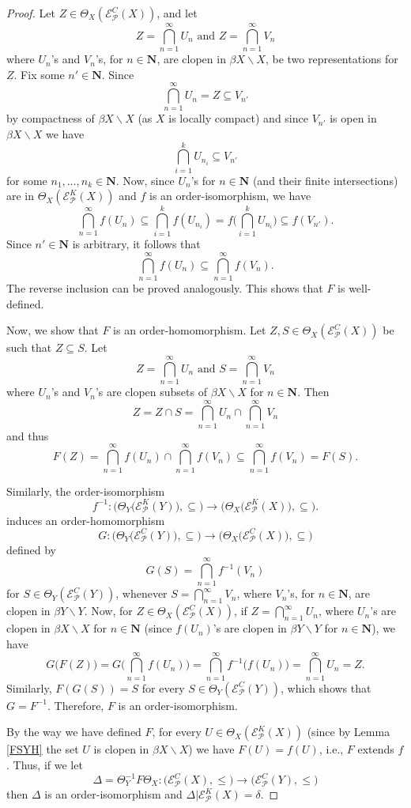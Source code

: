 \documentclass{amsart}
\theoremstyle{definition}
\theoremstyle{remark}
\theoremstyle{notation}
\numberwithin{equation}{section}
\begin{document}
\begin{proof}
Let $Z\in \Theta_X({\mathscr E}^C_{{\mathcal P}}(X))$, and let
\[Z=\bigcap_{n=1}^\infty U_n\mbox{ and }Z=\bigcap_{n=1}^\infty V_n\]
where $U_n$'s and $V_n$'s, for $n\in \mathbf{N}$, are clopen in $\beta X\backslash X$, be two representations for $Z$.  Fix some  $n'\in \mathbf{N}$. Since
\[\bigcap_{n=1}^\infty U_n=Z\subseteq V_{n'}\]
by compactness of $\beta X\backslash X$ (as $X$ is locally compact) and since $V_{n'}$ is open in $\beta X\backslash X$ we have
\[\bigcap_{i=1}^kU_{n_i}\subseteq V_{n'}\]
for some $n_1,\ldots,n_k\in \mathbf{N}$. Now, since $U_n$'s for $n\in \mathbf{N}$ (and their finite intersections) are
in  $\Theta_X({\mathscr E}^K_{{\mathcal P}}(X))$ and $f$ is an  order-isomorphism, we have
\[\bigcap_{n=1}^\infty f(U_n)\subseteq\bigcap_{i=1}^kf(U_{n_i})= f\Big(\bigcap_{i=1}^kU_{n_i}\Big)\subseteq f( V_{n'}).\]
Since $n'\in \mathbf{N}$ is arbitrary, it follows that
\[\bigcap_{n=1}^\infty f(U_n)\subseteq \bigcap_{n=1}^\infty f(V_n).\]
The reverse inclusion can be proved analogously. This shows that  $F$ is well-defined.

Now, we show that $F$ is an order-homomorphism. Let $Z,S\in\Theta_X({\mathscr E}^C_{{\mathcal P}}(X))$ be such that $Z\subseteq S$.
Let
\[Z=\bigcap_{n=1}^\infty U_n\mbox{ and }S=\bigcap_{n=1}^\infty V_n\]
where
$U_n$'s and $V_n$'s are clopen subsets of $\beta X\backslash X$ for $n\in \mathbf{N}$.
Then
\[Z=Z\cap S=\bigcap_{n=1}^\infty U_n\cap\bigcap_{n=1}^\infty V_n\]
and thus
\[F(Z)=\bigcap_{n=1}^\infty f(U_n)\cap\bigcap_{n=1}^\infty f(V_n)\subseteq\bigcap_{n=1}^\infty f(V_n)=F(S).\]

Similarly, the order-isomorphism
\[f^{-1}:\big(\Theta_Y\big({\mathscr E}^K_{{\mathcal P}}(Y)\big),\subseteq\big)\rightarrow\big(\Theta_X\big({\mathscr E}^K_{{\mathcal P}}(X)\big),\subseteq\big).\]
induces an order-homomorphism
\[G:\big(\Theta_Y\big({\mathscr E}^C_{{\mathcal P}}(Y)\big),\subseteq\big)\rightarrow\big(\Theta_X\big({\mathscr E}^C_{{\mathcal P}}(X)\big),\subseteq\big)\]
defined by
\[G(S)=\bigcap_{n=1}^\infty f^{-1}(V_n)\]
for $S\in \Theta_Y({\mathscr E}^C_{{\mathcal P}}(Y))$, whenever  $S=\bigcap_{n=1}^\infty V_n$, where $V_n$'s,
for $n\in \mathbf{N}$, are clopen in $\beta Y\backslash Y$.
Now, for $Z\in \Theta_X({\mathscr E}^C_{{\mathcal P}}(X))$,
if $Z=\bigcap_{n=1}^\infty U_n$, where  $U_n$'s  are clopen in $\beta X\backslash X$ for $n\in \mathbf{N}$
(since $f(U_n)$'s  are clopen in  $\beta Y\backslash Y$  for $n\in \mathbf{N}$),  we have
\[G\big(F(Z)\big)=G\Big(\bigcap_{n=1}^\infty f(U_n)\Big)=\bigcap_{n=1}^\infty f^{-1}\big(f(U_n)\big)=\bigcap_{n=1}^\infty U_n=Z.\]
Similarly, $F(G(S))=S$ for every $S\in\Theta_Y({\mathscr E}^C_{{\mathcal P}}(Y))$, which shows that $G=F^{-1}$. Therefore, $F$ is an  order-isomorphism.

By the way we have defined $F$, for every $U\in \Theta_X({\mathscr E}^K_{{\mathcal P}}(X))$ (since by
Lemma \ref{FSYH} the set $U$ is clopen in $\beta X\backslash X$) we have $F(U)=f(U)$, i.e., $F$ extends $f$. Thus, if we let
\[\Delta=\Theta_Y^{-1}F\Theta_X:\big({\mathscr E}^C_{{\mathcal P}}(X),\leq\big)\rightarrow\big({\mathscr E}^C_{{\mathcal P}}(Y),\leq\big)\]
then $\Delta$ is an  order-isomorphism and $\Delta|{\mathscr E}^K_{{\mathcal P}}(X)=\delta$.
\end{proof}
\end{document}
